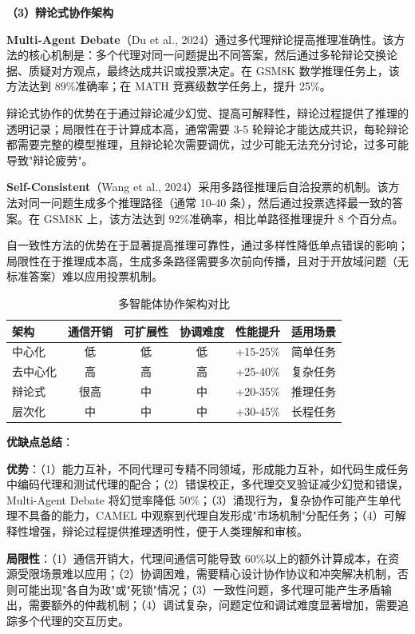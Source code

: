 \documentclass[12pt,a4paper]{article}
\begin{document}
\textbf{（3）辩论式协作架构}

\textbf{Multi-Agent Debate}（Du et al., 2024）通过多代理辩论提高推理准确性。该方法的核心机制是：多个代理对同一问题提出不同答案，然后通过多轮辩论交换论据、质疑对方观点，最终达成共识或投票决定。在 GSM8K 数学推理任务上，该方法达到 89\%准确率；在 MATH 竞赛级数学任务上，提升 25\%。

辩论式协作的优势在于通过辩论减少幻觉、提高可解释性，辩论过程提供了推理的透明记录；局限性在于计算成本高，通常需要 3-5 轮辩论才能达成共识，每轮辩论都需要完整的模型推理，且辩论轮次需要调优，过少可能无法充分讨论，过多可能导致"辩论疲劳"。

\textbf{Self-Consistent}（Wang et al., 2024）采用多路径推理后自洽投票的机制。该方法对同一问题生成多个推理路径（通常 10-40 条），然后通过投票选择最一致的答案。在 GSM8K 上，该方法达到 92\%准确率，相比单路径推理提升 8 个百分点。

自一致性方法的优势在于显著提高推理可靠性，通过多样性降低单点错误的影响；局限性在于推理成本高，生成多条路径需要多次前向传播，且对于开放域问题（无标准答案）难以应用投票机制。

\begin{table}[h]
\centering
\caption{多智能体协作架构对比}
\label{tab:multi-agent-compare}
\begin{tabular}{@{}lccccc@{}}
\toprule
\textbf{架构} & \textbf{通信开销} & \textbf{可扩展性} & \textbf{协调难度} & \textbf{性能提升} & \textbf{适用场景} \\
\midrule
中心化 & 低 & 低 & 低 & +15-25\% & 简单任务 \\
去中心化 & 高 & 高 & 高 & +25-40\% & 复杂任务 \\
辩论式 & 很高 & 中 & 中 & +20-35\% & 推理任务 \\
层次化 & 中 & 中 & 中 & +30-45\% & 长程任务 \\
\bottomrule
\end{tabular}
\end{table}

\textbf{优缺点总结}：

\textbf{优势}：（1）能力互补，不同代理可专精不同领域，形成能力互补，如代码生成任务中编码代理和测试代理的配合；（2）错误校正，多代理交叉验证减少幻觉和错误，Multi-Agent Debate 将幻觉率降低 50\%；（3）涌现行为，复杂协作可能产生单代理不具备的能力，CAMEL 中观察到代理自发形成"市场机制"分配任务；（4）可解释性增强，辩论过程提供推理透明性，便于人类理解和审核。

\textbf{局限性}：（1）通信开销大，代理间通信可能导致 60\%以上的额外计算成本，在资源受限场景难以应用；（2）协调困难，需要精心设计协作协议和冲突解决机制，否则可能出现"各自为政"或"死锁"情况；（3）一致性问题，多代理可能产生矛盾输出，需要额外的仲裁机制；（4）调试复杂，问题定位和调试难度显著增加，需要追踪多个代理的交互历史。
\end{document}
